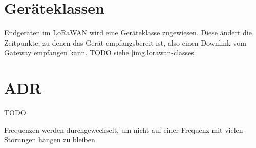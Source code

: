 


\section{Geräteklassen}\label{sec.lorawan.classes}
Endgeräten im LoRaWAN wird eine Geräteklasse zugewiesen.
Diese ändert die Zeitpunkte, zu denen das Gerät empfangsbereit ist, also einen Downlink vom Gateway empfangen kann.
TODO siehe \autoref{img.lorawan-classes}




\section{ADR}
TODO


Frequenzen werden durchgewechselt, um nicht auf einer Frequenz mit vielen Störungen hängen zu bleiben
